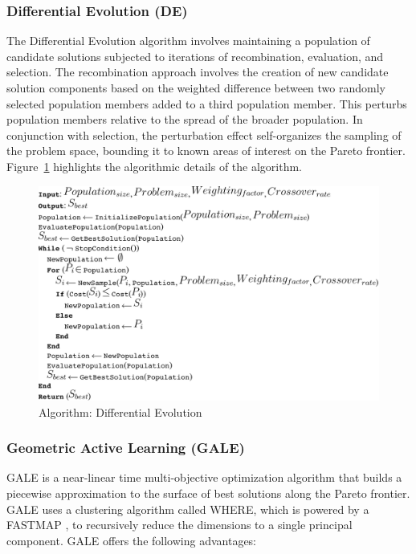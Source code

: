 \documentclass[conference]{IEEEtran}
\newcommand{\fig}[1]{Figure~\ref{fig:#1}}
\begin{document}
\subsubsection{Differential Evolution (DE)} 

The Differential Evolution algorithm involves maintaining a population of candidate solutions subjected to iterations of recombination, evaluation, and selection. The recombination approach involves the creation of new candidate solution components based on the weighted difference between two randomly selected population members added to a third population member. This perturbs population members relative to the spread of the broader population. In conjunction with selection, the perturbation effect self-organizes the sampling of the problem space, bounding it to known areas of interest on the Pareto frontier. \fig{de} highlights the algorithmic details of the algorithm.

\begin{figure}[h]
\includegraphics[width=\linewidth]{img/de.png}
\caption{Algorithm: Differential Evolution}	
\label{fig:de}
\end{figure}

	
\subsubsection{Geometric Active Learning (GALE)} 

GALE is a near-linear time multi-objective optimization algorithm that builds a piecewise approximation to the surface of best solutions along the Pareto frontier. GALE uses a clustering algorithm called WHERE, which is powered by a FASTMAP \cite{faloutsos95}, to recursively reduce the dimensions to a single principal component. GALE offers the following advantages:
	
\end{document}

